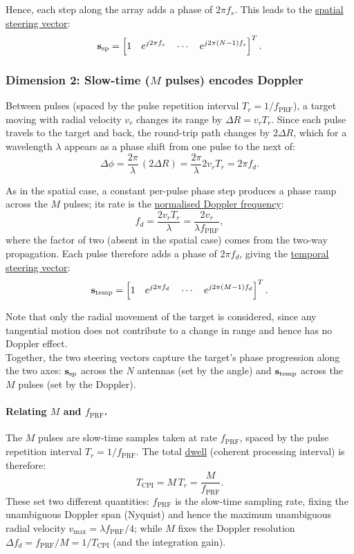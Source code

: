 \documentclass{article}
\begin{document}
Hence, each step along the array adds a phase of $2\pi f_s$. This leads to the \underline{spatial steering vector}: $$\vb s_\text{sp} = \left[1\quad e^{j2\pi f_s}\quad\cdots\quad e^{j2\pi(N-1)f_s}\right]^T.$$

\subsubsection{Dimension 2: Slow-time ($M$ pulses) encodes Doppler}
Between pulses (spaced by the pulse repetition interval $T_r = 1/f_\mathrm{PRF}$), a target moving with radial velocity $v_r$ changes its range by
$\Delta R = v_r T_r$. Since each pulse travels to the target and back, the round-trip path changes by $2\Delta R$, which for a wavelength $\lambda$ appears as a phase shift from one pulse to the next of:
$$\Delta\phi = \frac{2\pi}{\lambda}\,(2\Delta R)
             = \frac{2\pi}{\lambda}2v_r T_r = 2\pi f_d.$$

As in the spatial case, a constant per-pulse phase step produces a phase ramp across the $M$ pulses; its rate is the \underline{normalised Doppler frequency}:
$$f_d = \frac{2 v_r T_r}{\lambda} = \frac{2 v_r}{\lambda f_\textrm{PRF}},$$
where the factor of two (absent in the spatial case) comes from the two-way propagation. Each pulse therefore adds a phase of $2\pi f_d$, giving the \underline{temporal steering vector}:
$$\vb s_\text{temp} = \left[1 \quad e^{j2\pi f_d} \quad \cdots \quad
   e^{j2\pi(M-1)f_d}\right]^T.$$

Note that only the radial movement of the target is considered, since any tangential motion does not contribute to a change in range and hence has no Doppler effect.\\

Together, the two steering vectors capture the target's phase progression along the two axes: $\vb s_\text{sp}$ across the $N$ antennas (set by the angle) and $\vb s_\text{temp}$ across the $M$ pulses (set by the Doppler).

\paragraph{Relating $M$ and $f_\mathrm{PRF}$.}
The $M$ pulses are slow-time samples taken at rate $f_\mathrm{PRF}$, spaced by the pulse repetition interval $T_r = 1/f_\mathrm{PRF}$. The total \underline{dwell} (coherent processing interval) is therefore:
$$T_\mathrm{CPI} = M\,T_r = \frac{M}{f_\mathrm{PRF}}.$$
These set two different quantities: $f_\mathrm{PRF}$ is the slow-time sampling rate, fixing the unambiguous Doppler span (Nyquist) and hence the maximum unambiguous radial velocity $v_{\max} = \lambda f_\mathrm{PRF}/4$; while $M$ fixes the Doppler resolution $\Delta f_d = f_\mathrm{PRF}/{M} = 1/T_\mathrm{CPI}$ (and the integration gain).
\end{document}
